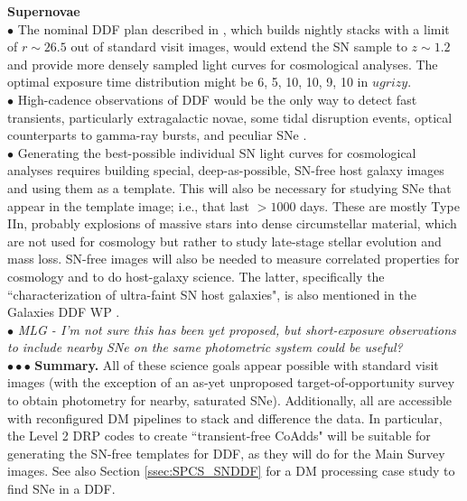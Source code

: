 \documentclass[DM,lsstdraft,toc]{lsstdoc}
\begin{document}
\noindent \textbf{Supernovae} \\
$\bullet$ The nominal DDF plan described in \cite{2008arXiv0805.2366I}, which builds nightly stacks with a limit of $r\sim26.5$ out of standard visit images, would extend the SN sample to $z\sim1.2$ and provide more densely sampled light curves for cosmological analyses. The optimal exposure time distribution might be 6, 5, 10, 10, 9, 10 in $ugrizy$. \cite{KesslerWP} \\
$\bullet$ High-cadence observations of DDF would be the only way to detect fast transients, particularly extragalactic novae, some tidal disruption events, optical counterparts to gamma-ray bursts, and peculiar SNe \cite{2014ApJ...794...23D}. \\
$\bullet$ Generating the best-possible individual SN light curves for cosmological analyses requires building special, deep-as-possible, SN-free host galaxy images and using them as a template. This will also be necessary for studying SNe that appear in the template image; i.e., that last $>1000$ days. These are mostly Type IIn, probably explosions of massive stars into dense circumstellar material, which are not used for cosmology but rather to study late-stage stellar evolution and mass loss. SN-free images will also be needed to measure correlated properties for cosmology and to do host-galaxy science. The latter, specifically the ``characterization of ultra-faint SN host galaxies", is also mentioned in the Galaxies DDF WP \cite{FergusonWP}. \\
$\bullet$ \textit{MLG - I'm not sure this has been yet proposed, but short-exposure observations to include nearby SNe on the same photometric system could be useful?} \\
$\bullet \bullet \bullet$ {\bf Summary.} All of these science goals appear possible with standard visit images (with the exception of an as-yet unproposed target-of-opportunity survey to obtain photometry for nearby, saturated SNe). Additionally, all are accessible with reconfigured DM pipelines to stack and difference the data. In particular, the Level 2 DRP codes to create ``transient-free CoAdds" will be suitable for generating the SN-free templates for DDF, as they will do for the Main Survey images. See also Section \ref{ssec:SPCS_SNDDF} for a DM processing case study to find SNe in a DDF.
\end{document}
